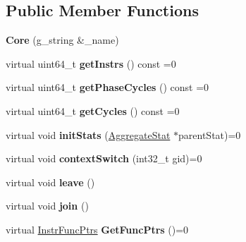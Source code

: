 \subsection*{Public Member Functions}
\begin{DoxyCompactItemize}
\item 
\hypertarget{classCore_ab977c051264daa466362c38f20bf7512}{{\bfseries Core} (g\-\_\-string \&\-\_\-name)}\label{classCore_ab977c051264daa466362c38f20bf7512}

\item 
\hypertarget{classCore_ac3fa041719ceb8c63958eb834eb67c99}{virtual uint64\-\_\-t {\bfseries get\-Instrs} () const =0}\label{classCore_ac3fa041719ceb8c63958eb834eb67c99}

\item 
\hypertarget{classCore_ac47f10ddfe0e591620113e0fe2ae2351}{virtual uint64\-\_\-t {\bfseries get\-Phase\-Cycles} () const =0}\label{classCore_ac47f10ddfe0e591620113e0fe2ae2351}

\item 
\hypertarget{classCore_ac2e4ef43c71b1e50a3cc89d1ec8c58aa}{virtual uint64\-\_\-t {\bfseries get\-Cycles} () const =0}\label{classCore_ac2e4ef43c71b1e50a3cc89d1ec8c58aa}

\item 
\hypertarget{classCore_a093c22041db0e412cf0c84c862676629}{virtual void {\bfseries init\-Stats} (\hyperlink{classAggregateStat}{Aggregate\-Stat} $\ast$parent\-Stat)=0}\label{classCore_a093c22041db0e412cf0c84c862676629}

\item 
\hypertarget{classCore_a9e0d130d0746bed33473dcd8cbc397bb}{virtual void {\bfseries context\-Switch} (int32\-\_\-t gid)=0}\label{classCore_a9e0d130d0746bed33473dcd8cbc397bb}

\item 
\hypertarget{classCore_abf2a30c06a88df1382a7d0cf0da08d2c}{virtual void {\bfseries leave} ()}\label{classCore_abf2a30c06a88df1382a7d0cf0da08d2c}

\item 
\hypertarget{classCore_a2e692b0643767e9abf6b94794cd0c388}{virtual void {\bfseries join} ()}\label{classCore_a2e692b0643767e9abf6b94794cd0c388}

\item 
\hypertarget{classCore_acf1335c8e2215e3e1ff91aa71359f4ec}{virtual \hyperlink{structInstrFuncPtrs}{Instr\-Func\-Ptrs} {\bfseries Get\-Func\-Ptrs} ()=0}\label{classCore_acf1335c8e2215e3e1ff91aa71359f4ec}


\end{DoxyCompactItemize}
